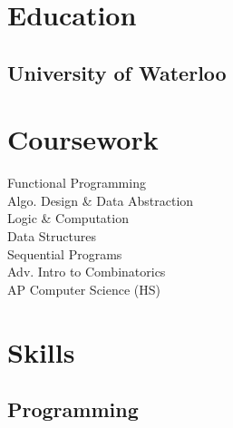 \documentclass[letterpaper]{deedy-resume} %
\begin{document}
\begin{minipage}[t]{0.33\textwidth} %


  \section{Education} 

  \subsection{University of Waterloo}


  \sectionspace %



  \section{Coursework}

  Functional Programming \\
  Algo. Design \& Data Abstraction \\
  Logic \& Computation \\
  Data Structures \\
  Sequential Programs \\
  Adv. Intro to Combinatorics \\
  AP Computer Science (HS)

  \sectionspace %


  \section{Skills}

  \vspace{2mm}

  \subsection{Programming}


\end{minipage}
\end{document}
